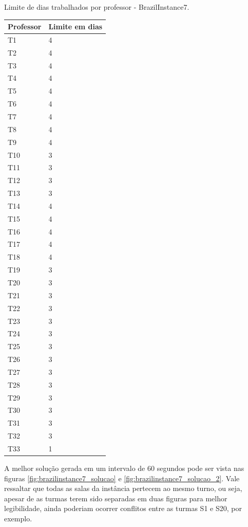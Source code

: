 \begin{quadro}[h]
	\centering
	\caption{Limite de dias trabalhados por professor - BrazilInstance7.\label{qua:limites_dias_trabalhados_brazilinstance7}}
	\begin{tabular}{|p{2cm}|p{4cm}|}
		\hline
		\textbf{Professor} & \textbf{Limite em dias} \\
		\hline
		T1 & 4 \\
		\hline
		T2 & 4 \\
		\hline
		T3 & 4 \\
		\hline
		T4 & 4 \\
		\hline
		T5 & 4 \\
		\hline
		T6 & 4 \\
		\hline
		T7 & 4 \\
		\hline
		T8 & 4 \\
		\hline
		T9 & 4 \\
		\hline
		T10 & 3 \\
		\hline
		T11 & 3 \\
		\hline
		T12 & 3 \\
		\hline
		T13 & 3 \\
		\hline
		T14 & 4 \\
		\hline
		T15 & 4 \\
		\hline
		T16 & 4 \\
		\hline
		T17 & 4 \\
		\hline
		T18 & 4 \\
		\hline
		T19 & 3 \\
		\hline
		T20 & 3 \\
		\hline
		T21 & 3 \\
		\hline
		T22 & 3 \\
		\hline
		T23 & 3 \\
		\hline
		T24 & 3 \\
		\hline
		T25 & 3 \\
		\hline
		T26 & 3 \\
		\hline
		T27 & 3 \\
		\hline
		T28 & 3 \\
		\hline
		T29 & 3 \\
		\hline
		T30 & 3 \\
		\hline
		T31 & 3 \\
		\hline
		T32 & 3 \\
		\hline
		T33 & 1 \\
		\hline
	\end{tabular}
\end{quadro}

\newpage
A melhor solução gerada em um intervalo de 60 segundos pode ser vista nas figuras \ref{fig:brazilinstance7_solucao} e \ref{fig:brazilinstance7_solucao_2}. Vale ressaltar que todas as salas da instância pertecem ao mesmo turno, ou seja, apesar de as turmas terem sido separadas em duas figuras para melhor legibilidade, ainda poderiam ocorrer conflitos entre as turmas S1 e S20, por exemplo.


